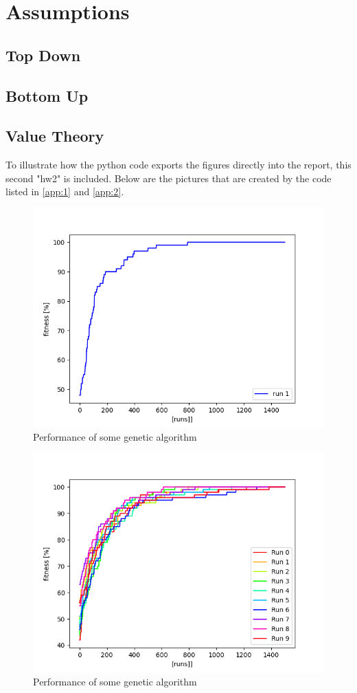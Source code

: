 \section{Assumptions}\label{sec:assumptions}
\subsection{Top Down}\label{subsec:assumptions_top_down}

\subsection{Bottom Up}\label{subsec:assumptions_bottom_up}
\subsection{Value Theory}\label{subsec:assumptions_value_theory}
To illustrate how the python code exports the figures directly into the report, this second "hw2" is included. Below are the pictures that are created by the code listed in \cref{app:1} and \cref{app:2}.
\begin{figure}[H]
    \centering
    \includegraphics[width=1\textwidth]{Images/4a.png}
    \caption{Performance of some genetic algorithm}
\end{figure}

\begin{figure}[H]
    \centering
    \includegraphics[width=1\textwidth]{Images/4b.png}
    \caption{Performance of some genetic algorithm}
\end{figure}